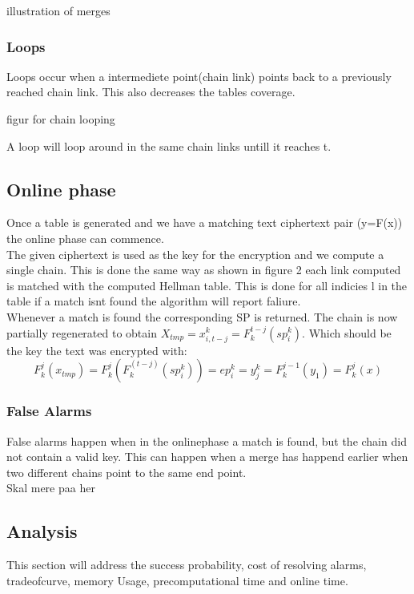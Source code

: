 illustration of merges
\subsubsection{Loops}
Loops occur when a intermediete point(chain link) points back to a previously reached chain link. This also decreases the tables coverage.

figur for chain looping

A loop will loop around in the same chain links untill it reaches t.

\subsection*{Online phase}
Once a table is generated and we have a matching text ciphertext pair (y=F(x)) the online phase can commence.\\
The given ciphertext is used as the key for the encryption and we compute a single chain. This is done the same way as shown in figure 2 each link computed is matched with the computed Hellman table. This is done for all indicies l in the table if a match isnt found the algorithm will report faliure.\\

Whenever a match is found the corresponding SP is returned. The chain is now partially regenerated to obtain $X_{tmp}=x^k_{i,t-j}=F^{t-j}_k(sp^k_i)$. Which should be the key the text was encrypted with:
\begin{equation}
    F^j_k(x_{tmp})=F^j_k(F^(t-j)_k(sp^k_i))=ep^k_i=y^k_j=F^{j-1}_k(y_1)=F^j_k(x)
\end{equation}
\subsubsection{False Alarms}
False alarms happen when in the onlinephase a match is found, but the chain did not contain a valid key. This can happen when a merge has happend earlier when two different chains point to the same end point.
\\
Skal mere paa her
\subsection*{Analysis}
This section will address the success probability, cost of resolving alarms, tradeofcurve, memory Usage, precomputational time and online time.


